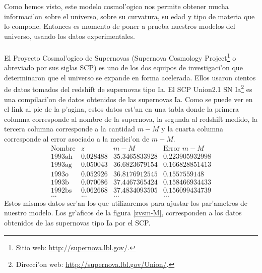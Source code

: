 Como hemos visto, este modelo cosmol'ogico nos permite obtener mucha informaci'on sobre el universo, sobre su curvatura, su edad y tipo de 
materia que lo compone. Entonces es momento de poner a prueba nuestros modelos del universo, usando los datos experimentales.\\ \\
El Proyecto Cosmol'ogico de Supernovas (Supernova Cosmology Project\footnote{Sitio web: \url{http://supernova.lbl.gov/}.} o abreviado por sus siglas SCP) es uno de los dos equipos de investigaci'on que determinaron
que el universo se expande en forma acelerada. Ellos usaron cientos de datos tomados del redshift de supernovas tipo Ia.
El SCP Union2.1 SN Ia\footnote{Direcci'on web: \url{http://supernova.lbl.gov/Union/}.} es una compilaci'on de datos obtenidos de las supernovas Ia.
Como se puede ver en el link al pie de la p'agina, estos datos est'an en una tabla donde la primera columna corresponde al nombre de la
supernova, la segunda al redshift medido, la tercera columna corresponde a la cantidad $m-M$ y la cuarta columna corresponde al error asociado a la medici'on de $m-M$.
\begin{equation}
\begin{array}{lccl}
\mbox{Nombre} & z        &     m-M       & \mbox{Error } m-M\\
1993\mbox{ah} & 0.028488 & 35.3465833928 & 0.223905932998	\\
1993\mbox{ag} & 0.050043 & 36.6823679154 & 0.166828851413	\\
1993\mbox{o}  & 0.052926 & 36.8176912545 & 0.1557559148	\\
1993\mbox{b}  & 0.070086 & 37.4467365424 & 0.158466934433	\\
1992\mbox{bs} & 0.062668 & 37.4834093505 & 0.156099434739	\\
...    & ...	  & ...	      	  & ...
\end{array}
\end{equation}
Estos mismos datos ser'an los que utilizaremos
para ajustar los par'ametros de nuestro modelo. Los gr'aficos de la figura \ref{zvsm-M}, corresponden a los datos obtenidos 
de las supernovas tipo Ia por el SCP.
